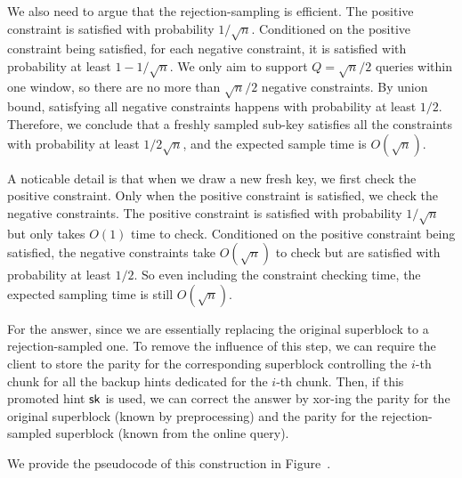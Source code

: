 \begin{enumerate}
    We also need to argue that the rejection-sampling is efficient. The positive
    constraint is satisfied with probability $1/\sqrt{n}$. Conditioned on the
    positive constraint being satisfied, for each negative constraint, it is
    satisfied with probability at least $1-1/\sqrt{n}$. We only aim to support
    $Q=\sqrt{n}/2$ queries within one window, so there are no more than
    $\sqrt{n}/2$ negative constraints. By union bound, satisfying all negative
    constraints happens with probability at least $1/2$. Therefore, we conclude
    that a freshly sampled sub-key satisfies all the constraints with
    probability at least $1/2\sqrt{n}$, and the expected sample time is
    $O(\sqrt{n})$. 
    
    A noticable detail is that when we draw a new fresh key,
    we first check the positive constraint. Only when the positive constraint is
    satisfied, we check the negative constraints. The positive constraint is
    satisfied with probability $1/\sqrt{n}$ but only takes $O(1)$ time to check.
    Conditioned on the positive constraint being satisfied, the negative
    constraints take $O(\sqrt{n})$ to check but are satisfied with probability
    at least $1/2$. So even including the constraint checking time, the expected
    sampling time is still $O(\sqrt{n})$.
    
    For the answer, since we are essentially replacing the original superblock
    to a rejection-sampled one. To remove the influence of this step, we can
    require the client to store the parity for the corresponding superblock
    controlling the $i$-th chunk for all the backup hints dedicated for the
    $i$-th chunk. Then, if this promoted hint $\mathsf{sk}$ is used, we can correct the
    answer by xor-ing the parity for the original superblock (known by preprocessing) and the parity for the
    rejection-sampled superblock (known from the online
    query).%
    
\end{enumerate}


We provide the pseudocode of this construction in
Figure~.

